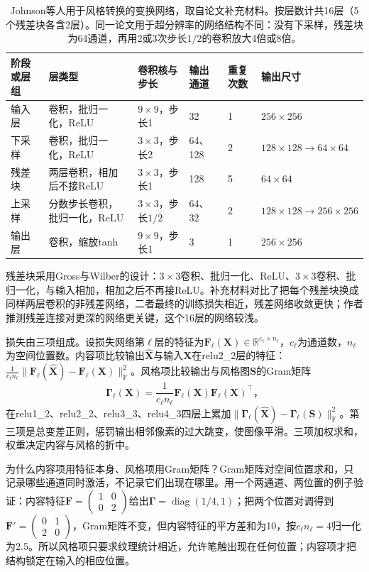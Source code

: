 \begin{table}[htbp]
 \centering
 \small
 \begin{tabularx}{\linewidth}{@{}p{16mm}Xp{15mm}p{9mm}p{6mm}p{15mm}@{}}
  \toprule
  阶段或层组 & 层类型 & 卷积核与步长 & 输出通道 & 重复次数 & 输出尺寸\\
  \midrule
  输入层 & 卷积，批归一化，ReLU & $9\times9$，步长1 & 32 & 1 & $256\times256$\\
  下采样 & 卷积，批归一化，ReLU & $3\times3$，步长2 & 64、128 & 2 & $128\times128\to64\times64$\\
  残差块 & 两层卷积，相加后不接ReLU & $3\times3$，步长1 & 128 & 5 & $64\times64$\\
  上采样 & 分数步长卷积，批归一化，ReLU & $3\times3$，步长$1/2$ & 64、32 & 2 & $128\times128\to256\times256$\\
  输出层 & 卷积，缩放tanh & $9\times9$，步长1 & 3 & 1 & $256\times256$\\
  \bottomrule
 \end{tabularx}
 \caption{Johnson等人用于风格转换的变换网络，取自论文补充材料。按层数计共16层（5个残差块各含2层）。同一论文用于超分辨率的网络结构不同：没有下采样，残差块为64通道，再用2或3次步长$1/2$的卷积放大4倍或8倍。}
 \label{tab:vision-johnson-structure}
\end{table}

残差块采用Gross与Wilber的设计：$3\times3$卷积、批归一化、ReLU、$3\times3$卷积、批归一化，与输入相加，相加之后不再接ReLU。补充材料对比了把每个残差块换成同样两层卷积的非残差网络，二者最终的训练损失相近，残差网络收敛更快；作者推测残差连接对更深的网络更关键，这个16层的网络较浅。

损失由三项组成。设损失网络第$\ell$层的特征为$\bm{F}_\ell(\bm{X})\in\mathbb{R}^{c_\ell\times n_\ell}$，$c_\ell$为通道数，$n_\ell$为空间位置数。内容项比较输出$\widehat{\bm{X}}$与输入$\bm{X}$在relu2\_2层的特征：$\frac{1}{c_\ell n_\ell}\lVert\bm{F}_\ell(\widehat{\bm{X}})-\bm{F}_\ell(\bm{X})\rVert_{\mathrm{F}}^2$。风格项比较输出与风格图$\bm{S}$的Gram矩阵
\begin{equation}
 \bm{\Gamma}_\ell(\bm{X})
 =\frac{1}{c_\ell n_\ell}
   \bm{F}_\ell(\bm{X})\bm{F}_\ell(\bm{X})^\top\text{，}
 \label{eq:vision-style-gram}
\end{equation}
在relu1\_2、relu2\_2、relu3\_3、relu4\_3四层上累加$\lVert\bm{\Gamma}_\ell(\widehat{\bm{X}})-\bm{\Gamma}_\ell(\bm{S})\rVert_{\mathrm{F}}^2$。第三项是总变差正则，惩罚输出相邻像素的过大跳变，使图像平滑。三项加权求和，权重决定内容与风格的折中。

为什么内容项用特征本身、风格项用Gram矩阵？Gram矩阵对空间位置求和，只记录哪些通道同时激活，不记录它们出现在哪里。用一个两通道、两位置的例子验证：内容特征$\bm{F}=\left(\begin{smallmatrix}1&0\\0&2\end{smallmatrix}\right)$给出$\bm{\Gamma}=\operatorname{diag}(1/4,1)$；把两个位置对调得到$\bm{F}'=\left(\begin{smallmatrix}0&1\\2&0\end{smallmatrix}\right)$，Gram矩阵不变，但内容特征的平方差和为10，按$c_\ell n_\ell=4$归一化为2.5。所以风格项只要求纹理统计相近，允许笔触出现在任何位置；内容项才把结构锁定在输入的相应位置。

